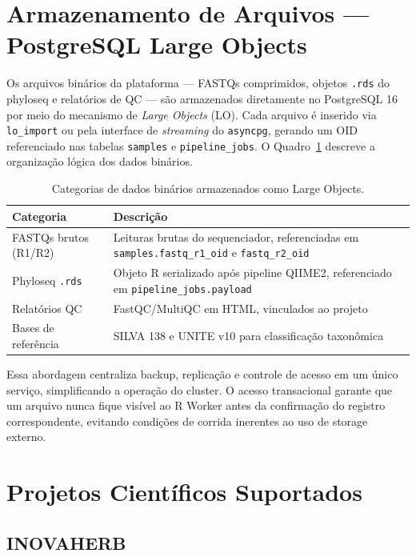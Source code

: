 \section{Armazenamento de Arquivos — PostgreSQL Large Objects}

Os arquivos binários da plataforma — FASTQs comprimidos, objetos
\texttt{.rds} do phyloseq e relatórios de QC — são armazenados
diretamente no PostgreSQL 16 por meio do mecanismo de \textit{Large
Objects} (LO). Cada arquivo é inserido via \texttt{lo\_import} ou
pela interface de \textit{streaming} do \texttt{asyncpg}, gerando um
OID referenciado nas tabelas \texttt{samples} e
\texttt{pipeline\_jobs}. O Quadro~\ref{qd:lo} descreve a organização
lógica dos dados binários.

\begin{table}[H]
\centering
\caption{Categorias de dados binários armazenados como Large Objects.}
\label{qd:lo}
\begin{tabularx}{\textwidth}{lX}
\toprule
\textbf{Categoria} & \textbf{Descrição} \\
\midrule
FASTQs brutos (R1/R2) & Leituras brutas do sequenciador, referenciadas em \texttt{samples.fastq\_r1\_oid} e \texttt{fastq\_r2\_oid} \\
Phyloseq \texttt{.rds}  & Objeto R serializado após pipeline QIIME2, referenciado em \texttt{pipeline\_jobs.payload} \\
Relatórios QC           & FastQC/MultiQC em HTML, vinculados ao projeto \\
Bases de referência     & SILVA 138 e UNITE v10 para classificação taxonômica \\
\bottomrule
\end{tabularx}
\end{table}

Essa abordagem centraliza backup, replicação e controle de acesso
em um único serviço, simplificando a operação do cluster. O acesso
transacional garante que um arquivo nunca fique visível ao R Worker
antes da confirmação do registro correspondente, evitando condições
de corrida inerentes ao uso de storage externo.

\section{Projetos Científicos Suportados}

\subsection{INOVAHERB}


